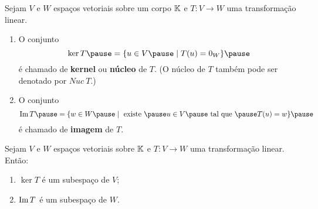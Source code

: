 \documentclass{beamer}
\begin{document}
\begin{frame}
    \begin{definicao}
        Sejam $V$ e $W$ espaços vetoriais sobre um corpo $\mathbb{K}$ \pause e $T : V \to W$ uma transformação linear.\pause
        \begin{enumerate}[label={\roman*})]
            \item O conjunto\pause
            \[
            \ker T \pause = \{u \in V \pause \mid T(u) = 0_W\}\pause
            \]
            é chamado de \textbf{kernel} \pause ou \textbf{núcleo} de $T$. \pause (O núcleo de $T$ também pode ser denotado por $Nuc\ T$.)\pause

            \vspace*{1.5cm}

            \item O conjunto\pause
            \[
            \im T \pause = \{w \in W \pause \mid \mbox{ existe } \pause u \in V \pause \mbox{ tal que } \pause T(u) = w\}\pause
            \]
            é chamado de \textbf{imagem} de $T$.
        \end{enumerate}
    \end{definicao}
\end{frame}

\begin{frame}

    \begin{proposicao}
        Sejam $V$ e $W$ espaços vetoriais sobre $\mathbb{K}$ \pause e $T : V \to W$ uma transformação linear. \pause Então:\pause
        \begin{enumerate}[label={\roman*})]
            \item $\ker T$ \pause é um subespaço de $V$;\pause

            \vspace*{1cm}

            \item ${\rm Im\,} T$ \pause é um subespaço de $W$.
        \end{enumerate}
    \end{proposicao}
\end{frame}
\end{document}
